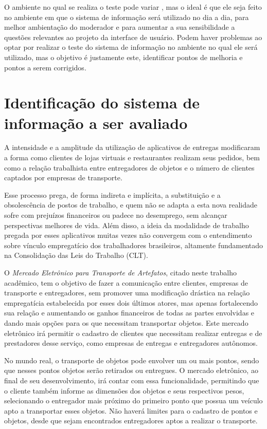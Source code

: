 \documentclass[
	article,
	11pt,
	oneside,
	a4paper,
	english,
	brazil,
	sumario=tradicional
]{abntex2}
\begin{document}
	O ambiente no qual se realiza o teste pode variar \cite{usabilidade-na-web}, mas o ideal é que ele seja feito no ambiente em que o sistema de informação será utilizado no dia a dia, para melhor ambientação do moderador e para aumentar a sua sensibilidade a questões relevantes ao projeto da interface de usuário. Podem haver problemas ao optar por realizar o teste do sistema de informação no ambiente no qual ele será utilizado, mas o objetivo é justamente este, identificar pontos de melhoria e pontos a serem corrigidos.
	
\vspace*{\fill}
\pagebreak

\section*{Identificação do sistema de informação a ser avaliado}
	
	A intensidade e a amplitude da utilização de aplicativos de entregas modificaram a forma como clientes de lojas virtuais e restaurantes realizam seus pedidos, bem como a relação trabalhista entre entregadores de objetos e o número de clientes captados por empresas de transporte.

	Esse processo prega, de forma indireta e implícita, a substituição e a obsolescência de postos de trabalho, e quem não se adapta a esta nova realidade sofre com prejuízos financeiros ou padece no desemprego, sem alcançar perspectivas melhores de vida. Além disso, a ideia da modalidade de trabalho pregada por esses aplicativos muitas vezes não convergem com o entendimento sobre vínculo empregatício dos trabalhadores brasileiros, altamente fundamentado na Consolidação das Leis do Trabalho (CLT).

	O \textit{Mercado Eletrônico para Transporte de Artefatos}, citado neste trabalho acadêmico, tem o objetivo de fazer a comunicação entre clientes, empresas de transporte e entregadores, sem promover uma modificação drástica na relação empregatícia estabelecida por esses dois últimos atores, mas apenas fortalecendo sua relação e aumentando os ganhos financeiros de todas as partes envolvidas e dando mais opções para os que necessitam transportar objetos. Este mercado eletrônico irá permitir o cadastro de clientes que necessitam realizar entregas e de prestadores desse serviço, como empresas de entregas e entregadores autônomos.

	No mundo real, o transporte de objetos pode envolver um ou mais pontos, sendo que nesses pontos objetos serão retirados ou entregues. O mercado eletrônico, ao final de seu desenvolvimento, irá contar com essa funcionalidade, permitindo que o cliente também informe as dimensões dos objetos e seus respectivos pesos, selecionando o entregador mais próximo do primeiro ponto que possua um veículo apto a transportar esses objetos. Não haverá limites para o cadastro de pontos e objetos, desde que sejam encontrados entregadores aptos a realizar o transporte.
\end{document}
